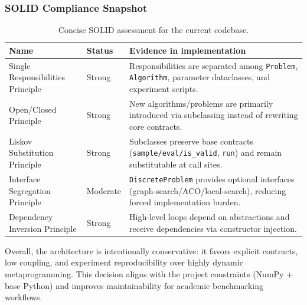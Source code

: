\subsubsection{SOLID Compliance Snapshot}
\begin{table}[H]
\centering
\caption{Concise SOLID assessment for the current codebase.}
\label{tab:solid-snapshot}
\begin{tabular}{p{1.0cm} p{2.6cm} p{8.9cm}}
\hline
\textbf{Name} & \textbf{Status} & \textbf{Evidence in implementation} \\
\hline
Single Responsibilities Principle & Strong & Responsibilities are separated among \texttt{Problem}, \texttt{Algorithm}, parameter dataclasses, and experiment scripts. \\
Open/Closed Principle & Strong & New algorithms/problems are primarily introduced via subclassing instead of rewriting core contracts. \\
Liskov Substitution Principle & Strong & Subclasses preserve base contracts (\texttt{sample/eval/is\_valid}, \texttt{run}) and remain substitutable at call sites. \\
Interface Segregation Principle & Moderate & \texttt{DiscreteProblem} provides optional interfaces (graph-search/ACO/local-search), reducing forced implementation burden. \\
Dependency Inversion Principle & Strong & High-level loops depend on abstractions and receive dependencies via constructor injection. \\
\hline
\end{tabular}
\end{table}

Overall, the architecture is intentionally conservative: it favors explicit contracts, low coupling, and experiment reproducibility over highly dynamic metaprogramming. This decision aligns with the project constraints (NumPy + base Python) and improves maintainability for academic benchmarking workflows.